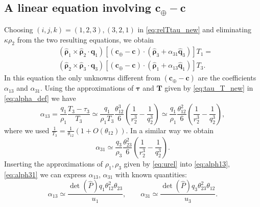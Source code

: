 \documentclass[11pt]{article}
\def\angmom{\bm{c}}
\def\angmom{{\bm{c}}}
\begin{document}
\subsection{A linear equation involving $\angmom_\oplus-\angmom$}

Choosing $(i,j,k)=(1,2,3), (3,2,1)$ in \eqref{eq:relTtau_new} and eliminating $\kappa\rho_2$ from the two resulting equations, we obtain
\begin{equation}\label{eq:s2Geo}
    \begin{split}
    & \left(\hat{\bm{\rho}}_1\times\hat{\bm{\rho}}_2 \cdot\bm{q}_1\right)
    \left[\left(\bm{c}_\oplus-\bm{c}\right)\cdot
      \left(\hat{\bm{\rho}}_3 + \alpha_{31}\hat{\bm{q}}_3\right)\right]T_1
    =\\
    & \left(\hat{\bm{\rho}}_2\times\hat{\bm{\rho}}_3 \cdot\bm{q}_3\right)
    \left[\left(\bm{c}_\oplus-\bm{c}\right)\cdot
      \left(\hat{\bm{\rho}}_1 + \alpha_{13}\hat{\bm{q}}_1\right)\right]T_3.
    \end{split}
\end{equation}
In  this equation the only unknowns different from $\left(\bm{c}_\oplus-\bm{c}\right)$ are the coefficients $\alpha_{13}$ and $\alpha_{31}$.
Using the approximations of $\bm{\tau}$ and $\bm{T}$ given by
\eqref{eq:tau_T_new} in \eqref{eq:alpha_def} we have
\begin{equation}\label{eq:alph13}
    \alpha_{13} = \frac{q_1}{\rho_1}\frac{T_3-\tau_3}{T_3}
    \simeq
    \frac{q_1}{\rho_1T_3}
    \frac{\theta_{12}^3}{6}\left(\frac{1}{r_2^3}-\frac{1}{q_2^3}\right)
    \simeq
    \frac{q_1}{\rho_1}
    \frac{\theta_{12}^2}{6}\left(\frac{1}{r_2^3}-\frac{1}{q_2^3}\right),
\end{equation}
%
where we used $\frac{1}{T_3} = \frac{1}{\theta_{12}}(1+O(\theta_{12}))$.
%
In a similar way we obtain
%
\begin{equation}\label{eq:alph31}
    \alpha_{31} 
    \simeq
    \frac{q_3}{\rho_3}
    \frac{\theta_{23}^2}{6}\left(\frac{1}{r_2^3}-\frac{1}{q_2^3}\right).
\end{equation}
Inserting the approximations of $\rho_1, \rho_3$ given by \eqref{eq:urel} into \eqref{eq:alph13}, \eqref{eq:alph31} we can express $\alpha_{13}$, $\alpha_{31}$ with known quantities:
%
\begin{equation}\label{eq:alphas}
    \alpha_{13} \simeq \frac{\det(\hat{P})q_1{\theta_{12}^{2}\theta_{23}}}{u_1},
    \qquad
    \alpha_{31} \simeq \frac{\det(\hat{P})q_3{\theta_{23}^2\theta_{12}}}{u_3}.
\end{equation}
\end{document}
